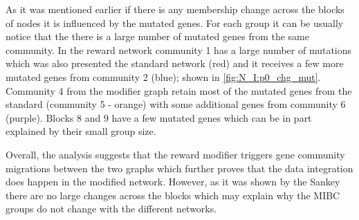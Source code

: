 As it was mentioned earlier if there is any membership change across the blocks of nodes it is influenced by the mutated genes. For each group it can be usually notice that the there is a large number of mutated genes from the same community. In the reward network community 1 has a large number of mutations which was also presented the standard network (red) and it receives a few more mutated genes from community 2 (blue); shown in \cref{fig:N_I:p0_chg_mut}. Community 4 from the modifier graph retain most of the mutated genes from the standard (community 5 - orange) with some additional genes from community 6 (purple). Blocks 8 and 9 have a few mutated genes which can be in part explained by their small group size. 

Overall, the analysis suggests that the reward modifier triggers gene community migrations between the two graphs which further proves that the data integration does happen in the modified network. However, as it was shown by the Sankey there are no large changes across the blocks which may explain why the MIBC groups do not change with the different networks.

